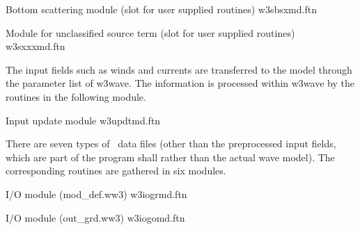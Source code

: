 \noindent
Bottom scattering module (slot for user supplied routines) \hfill {\file
w3sbsxmd.ftn}

\begin{flisti}
\end{flisti}

\noindent
Module for unclassified source term (slot for user supplied routines) \hfill
{\file w3sxxxmd.ftn}

\begin{flisti}
\end{flisti}

\noindent
The input fields such as winds and currents are transferred to the model
through the parameter list of {\F w3wave}. The information is processed within
{\F w3wave} by the routines in the following module.

\vspace{\baselineskip} \noindent
Input update module \hfill {\file w3updtmd.ftn}

\begin{flisti}
\end{flisti}

\noindent
There are seven types of \ws\ data files (other than the preprocessed input
fields, which are part of the program shall rather than the actual wave
model). The corresponding routines are gathered in six modules.

\vspace{\baselineskip} \noindent
I/O module ({\file mod\_def.ww3}) \hfill {\file w3iogrmd.ftn}

\begin{flisti}
\end{flisti}

\noindent
I/O module ({\file out\_grd.ww3}) \hfill {\file w3iogomd.ftn}

\begin{flisti}
\end{flisti}


